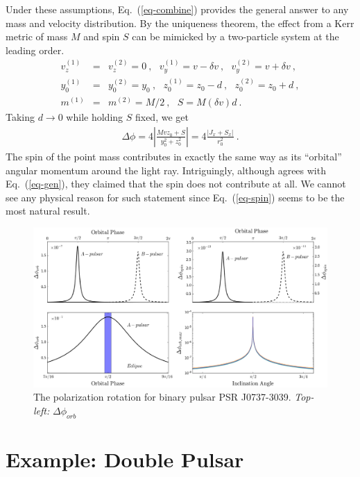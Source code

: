 \documentclass[aps,showpacs,onecolumn,floats,prd,superscriptaddress,nofootinbib]{revtex4}
\begin{document}
Under these assumptions, Eq.~(\ref{eq-combine}) provides the general answer to any mass and velocity distribution. 
By the uniqueness theorem, the effect from a Kerr metric of mass $M$ and spin $S$ can be mimicked by a two-particle system at the leading order.
\begin{eqnarray}
v_z^{(1)} &=& v_z^{(2)} = 0~,  \ \ \ v_y^{(1)} = v -\delta v~, \ \ \ v_y^{(2)} = v + \delta v~, \nonumber \\
y_0^{(1)} &=& y_0^{(2)} = y_0~, \ \ \ z_0^{(1)} = z_0-d~, \ \ \ z_0^{(2)} = z_0 + d~, \\
m^{(1)} &=& m^{(2)} = M/2~, \ \ \ S = M (\delta v) d~. \nonumber
\end{eqnarray}
Taking $d\rightarrow0$ while holding $S$ fixed, we get
\begin{eqnarray}
\Delta \phi = 4\left|\frac{Mvz_0 + S}{y_0^2 + z_0^2}\right| = 4 \frac{\left| J_x + S_x \right|}{r_0^2}~.
\label{eq-spin}
\end{eqnarray}
The spin of the point mass contributes in exactly the same way as its ``orbital'' angular momentum around the light ray. Intriguingly, although \cite{KopMas01} agrees with Eq.~(\ref{eq-gen}), they claimed that the spin does not contribute at all. We cannot see any physical reason for such statement since Eq.~(\ref{eq-spin}) seems to be the most natural result.



\begin{figure}
\includegraphics[width=\textwidth]{rotang.eps}
\caption{\label{fig:rotang}
The polarization rotation for binary pulsar PSR J0737-3039. {\it Top-left:} $\Delta \phi_{orb}$
 }
\end{figure}







\section{Example: Double Pulsar}
\label{sec-prediction}
\end{document}

